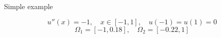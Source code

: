 \documentclass{beamer}
\begin{document}
\begin{frame}{Simple example}

\begin{equation*}
	u''(x) = -1, \quad x \in [-1,1], \quad u(-1)=u(1) = 0
\end{equation*}
\begin{equation*}
	\Omega_1 = [-1,0.18], \quad \Omega_2 = [-0.22, 1]
\end{equation*}

\begin{figure}

\end{figure}
\end{frame}
\end{document}
